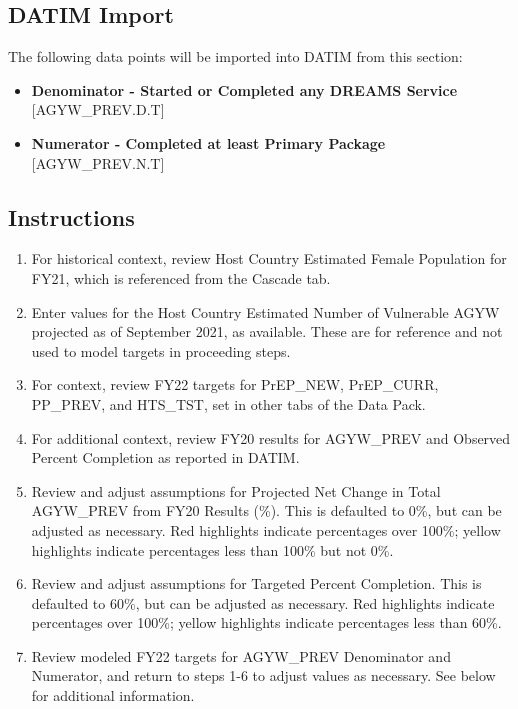 \documentclass[
  openany]{book}
\begin{document}
\hypertarget{datim-import-40}{%
\subsection{DATIM Import}\label{datim-import-40}}

The following data points will be imported into DATIM from this section:

\begin{itemize}
\item
  \textbf{Denominator - Started or Completed any DREAMS Service}
  {[}AGYW\_PREV.D.T{]}
\item
  \textbf{Numerator - Completed at least Primary Package} {[}AGYW\_PREV.N.T{]}
\end{itemize}

\hypertarget{instructions-40}{%
\subsection{Instructions}\label{instructions-40}}

\begin{enumerate}
\def\labelenumi{\arabic{enumi}.}
\item
  For historical context, review Host Country Estimated Female
  Population for FY21, which is referenced from the Cascade tab.
\item
  Enter values for the Host Country Estimated Number of Vulnerable
  AGYW projected as of September 2021, as available. These are for
  reference and not used to model targets in proceeding steps.
\item
  For context, review FY22 targets for PrEP\_NEW, PrEP\_CURR, PP\_PREV,
  and HTS\_TST, set in other tabs of the Data Pack.
\item
  For additional context, review FY20 results for AGYW\_PREV and
  Observed Percent Completion as reported in DATIM.
\item
  Review and adjust assumptions for Projected Net Change in Total
  AGYW\_PREV from FY20 Results (\%). This is defaulted to 0\%, but can be
  adjusted as necessary. Red highlights indicate percentages over
  100\%; yellow highlights indicate percentages less than 100\% but not
  0\%.
\item
  Review and adjust assumptions for Targeted Percent Completion. This
  is defaulted to 60\%, but can be adjusted as necessary. Red
  highlights indicate percentages over 100\%; yellow highlights
  indicate percentages less than 60\%.
\item
  Review modeled FY22 targets for AGYW\_PREV Denominator and Numerator,
  and return to steps 1-6 to adjust values as necessary. See below for
  additional information.
\end{enumerate}
\end{document}
